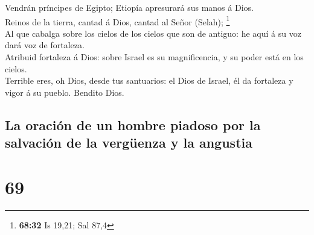  Vendrán príncipes de Egipto; Etiopía apresurará sus
manos á Dios.\\
 Reinos de la tierra, cantad á Dios, cantad al Señor
(Selah); \footnote{\textbf{68:32} Is 19,21; Sal 87,4}\\
 Al que cabalga sobre los cielos de los cielos que son de
antiguo: he aquí á su voz dará voz de fortaleza.\\
 Atribuid fortaleza á Dios: sobre Israel es su
magnificencia, y su poder está en los cielos.\\
 Terrible eres, oh Dios, desde tus santuarios: el Dios de
Israel, él da fortaleza y vigor á su pueblo. Bendito Dios.

\hypertarget{la-oraciuxf3n-de-un-hombre-piadoso-por-la-salvaciuxf3n-de-la-verguxfcenza-y-la-angustia}{%
\subsection{La oración de un hombre piadoso por la salvación de la
vergüenza y la
angustia}\label{la-oraciuxf3n-de-un-hombre-piadoso-por-la-salvaciuxf3n-de-la-verguxfcenza-y-la-angustia}}

\hypertarget{section-68}{%
\section{69}\label{section-68}}

